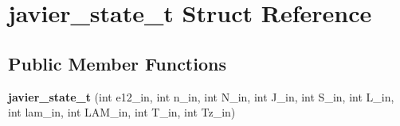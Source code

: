 \hypertarget{structjavier__state__t}{}\section{javier\+\_\+state\+\_\+t Struct Reference}
\label{structjavier__state__t}
\subsection*{Public Member Functions}
\begin{DoxyCompactItemize}
\item 
\mbox{\label{structjavier__state__t_a731d7377f5dc825b6ec43d69d80f60d2}} 
{\bfseries javier\+\_\+state\+\_\+t} (int e12\+\_\+in, int n\+\_\+in, int N\+\_\+in, int J\+\_\+in, int S\+\_\+in, int L\+\_\+in, int lam\+\_\+in, int L\+A\+M\+\_\+in, int T\+\_\+in, int Tz\+\_\+in)
\end{DoxyCompactItemize}
